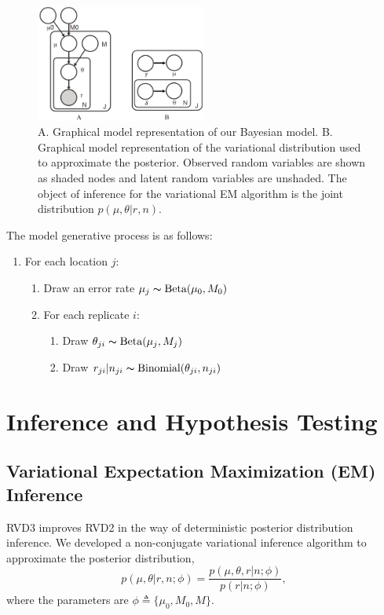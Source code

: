 \documentclass[11pt,reqno]{amsart}
\begin{document}
\begin{figure}[htpb]
\centering
\includegraphics[width=0.5\textwidth]{figs/rvd3_model.png}
\caption{A. Graphical model representation of our Bayesian model.
B. Graphical model representation of the variational distribution used to approximate the posterior.
Observed random variables are shown as shaded nodes and latent random variables are unshaded.
The object of inference for the variational EM algorithm is the joint distribution $p(\mu, \theta|r, n)$.}
\label{tbl:graphical_model}
\end{figure}
The model generative process is as follows:
\begin{enumerate}[noitemsep]
	\item For each location $j$:
	\begin{enumerate}
		\item Draw an error rate $\mu_j \thicksim \text{Beta}(\mu_0, M_0)$
		\item For each replicate $i$:
		\begin{enumerate}
			\item Draw $\theta_{ji} \thicksim \text{Beta}(\mu_j, M_j)$
			\item Draw $r_{ji} | n_{ji} \thicksim \text{Binomial}(\theta_{ji}, n_{ji})$
		\end{enumerate}
	\end{enumerate}
\end{enumerate}

\section{Inference and Hypothesis Testing}
\subsection{Variational Expectation Maximization (EM) Inference}
RVD3 improves RVD2 in the way of deterministic posterior distribution inference.
We developed a non-conjugate variational inference algorithm to approximate the posterior distribution,
\begin{equation}
	p(\mu, \theta | r, n; \phi)  = \frac{ p(\mu, \theta, r | n; \phi) } {p ( r | n; \phi)},
\end{equation}
where the parameters are $\phi \triangleq \{\mu_0, M_0, M\}$.
\end{document}
